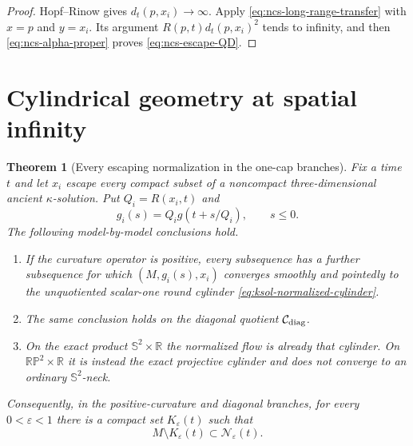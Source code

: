 \documentclass[10pt]{coll-l}
\newcommand{\R}{\mathbb{R}}
\newcommand{\Sph}{\mathbb{S}}
\newtheorem{theorem}{Theorem}[chapter]
\theoremstyle{definition}
\theoremstyle{remark}
\numberwithin{section}{chapter}
\numberwithin{equation}{chapter}
\begin{document}
\begin{proof}
Hopf--Rinow gives $d_t(p,x_i)\to\infty$.  Apply
\eqref{eq:ncs-long-range-transfer} with $x=p$ and $y=x_i$.  Its argument
$R(p,t)d_t(p,x_i)^2$ tends to infinity, and then
\eqref{eq:ncs-alpha-proper} proves \eqref{eq:ncs-escape-QD}.
\end{proof}

\section{Cylindrical geometry at spatial infinity}
\label{sec:ncs-cylindrical-end}

\begin{theorem}[Every escaping normalization in the one-cap branches]
\label{thm:ncs-arbitrary-escape-cylinder}
Fix a time $t$ and let $x_i$ escape every compact subset of a noncompact
three-dimensional ancient $\kappa$-solution.  Put $Q_i=R(x_i,t)$ and
\begin{equation}
 g_i(s)=Q_i g(t+s/Q_i),\qquad s\leq0.                  \label{eq:ncs-escaping-normalization}
\end{equation}
The following model-by-model conclusions hold.
\begin{enumerate}
\item If the curvature operator is positive, every subsequence has a
      further subsequence for which $(M,g_i(s),x_i)$ converges smoothly and
      pointedly to the unquotiented scalar-one round cylinder
      \eqref{eq:ksol-normalized-cylinder}.
\item The same conclusion holds on the diagonal quotient
      $\mathcal C_{\rm diag}$.
\item On the exact product $\Sph^2\times\R$ the normalized flow is already
      that cylinder.  On $\mathbb{RP}^2\times\R$ it is instead the exact
      projective cylinder and does not converge to an ordinary
      $\Sph^2$-neck.
\end{enumerate}
Consequently, in the positive-curvature and diagonal branches, for every
$0<\varepsilon<1$ there is a compact set $K_\varepsilon(t)$ such that
\begin{equation}
              M\setminus K_\varepsilon(t)
                    \subset\mathscr N_\varepsilon(t). \label{eq:ncs-eventual-strong-necks}
\end{equation}
\end{theorem}
\end{document}
